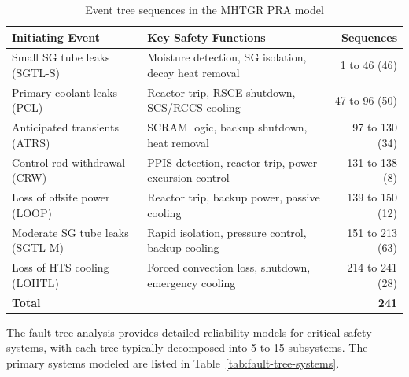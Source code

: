\begin{table}[]
\centering
\caption{Event tree sequences in the MHTGR PRA model}
\label{tab:mhtgr-event-tree-sequences}
\begin{tabularx}{\textwidth}{l >{\RaggedRight}X r}
\toprule
\textbf{Initiating Event} & \textbf{Key Safety Functions} & \textbf{Sequences} \\
\midrule
Small SG tube leaks (SGTL-S) & Moisture detection, SG isolation, decay heat removal & 1 to 46 (46) \\
Primary coolant leaks (PCL) & Reactor trip, RSCE shutdown, SCS/RCCS cooling & 47 to 96 (50) \\
Anticipated transients (ATRS) & SCRAM logic, backup shutdown, heat removal & 97 to 130 (34) \\
Control rod withdrawal (CRW) & PPIS detection, reactor trip, power excursion control & 131 to 138 (8) \\
Loss of offsite power (LOOP) & Reactor trip, backup power, passive cooling & 139 to 150 (12) \\
Moderate SG tube leaks (SGTL-M) & Rapid isolation, pressure control, backup cooling & 151 to 213 (63) \\
Loss of HTS cooling (LOHTL) & Forced convection loss, shutdown, emergency cooling & 214 to 241 (28) \\
\midrule
\textbf{Total} & & \textbf{241} \\
\bottomrule
\end{tabularx}
\end{table}

The fault tree analysis provides detailed reliability models for critical safety systems, with each tree typically decomposed into 5 to 15 subsystems. The primary systems modeled are listed in Table~\ref{tab:fault-tree-systems}.

